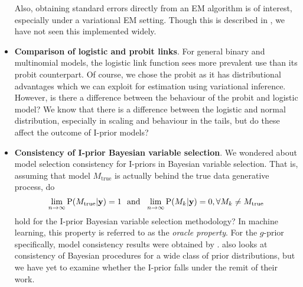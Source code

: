 \documentclass[11pt,twoside,openright]{report}
\begin{document}
\begin{itemize}
  Also, obtaining standard errors directly from an EM algorithm is of interest, especially under a variational EM setting.
  Though this is described in \citet[Ch. 4]{mclachlan2007algorithm}, we have not seen this implemented widely.
  
  \item \textbf{Comparison of logistic and probit links}.
  For general binary and multinomial models, the logistic link function sees more prevalent use than its probit counterpart.
  Of course, we chose the probit as it has distributional advantages which we can exploit for estimation using variational inference.
  However, is there a difference between the behaviour of the probit and logistic model?
  We know that there is a difference between the logistic and normal distribution, especially in scaling and behaviour in the tails, but do these affect the outcome of I-prior models?
  
  \item \textbf{Consistency of I-prior Bayesian variable selection}.
  We wondered about model selection consistency for I-priors in Bayesian variable selection.
  That is, assuming that model $M_\text{true}$ is actually behind the true data generative process, do
  \[
    \lim_{n\to\infty} \operatorname{P}(M_\text{true}|{\mathbf y}) = 1
    \ \ \text{and} \ \
    \lim_{n\to\infty} \operatorname{P}(M_k|{\mathbf y}) = 0, \forall M_k \neq M_\text{true}
  \]
  hold for the I-prior Bayesian variable selection methodology?
  In machine learning, this property is referred to as the \emph{oracle property}.
  For the $g$-prior specifically, model consistency results were obtained by \citet{fernandez2001benchmark,liang2008mixtures}.
  \citet{casella2009consistency} also looks at consistency of Bayesian procedures for a wide class of prior distributions, but we have yet to examine whether the I-prior falls under the remit of their work.
  
\end{itemize}
\end{document}
